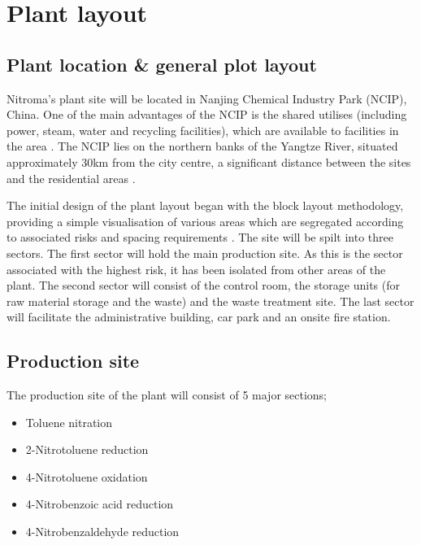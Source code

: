 \section{Plant layout}

\subsection{Plant location \& general plot layout}

Nitroma’s plant site will be located in Nanjing Chemical Industry Park (NCIP), China. One of the main advantages of the NCIP is the shared utilises (including power, steam, water and recycling facilities), which are available to facilities in the area \cite{independent_commodity_intelligence_services_china_2007}. The NCIP lies on the northern banks of the Yangtze River, situated approximately 30km from the city centre, a significant distance between the sites and the residential areas \cite{zeng_divergent_2011}.   


The initial design of the plant layout began with the block layout methodology, providing a simple visualisation of various areas which are segregated according to associated risks and spacing requirements \cite{center_for_chemical_process_safety_site_2010}. The site will be spilt into three sectors. The first sector will hold the main production site. As this is the sector associated with the highest risk, it has been isolated from other areas of the plant. The second sector will consist of the control room, the storage units (for raw material storage and the waste) and the waste treatment site. The last sector will facilitate the administrative building, car park and an onsite fire station.

\subsection{Production site}

The production site of the plant will consist of 5 major sections; 

\begin{itemize}
    \item Toluene nitration
    \item 2-Nitrotoluene reduction 
    \item 4-Nitrotoluene oxidation 
    \item 4-Nitrobenzoic acid reduction 
    \item 4-Nitrobenzaldehyde reduction 
\end{itemize}

